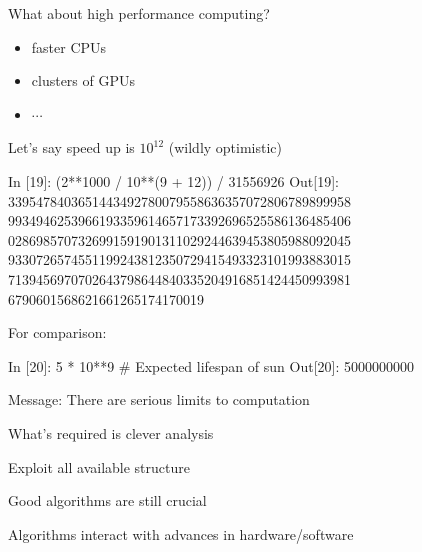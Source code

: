 \documentclass[
    xcolor={svgnames,dvipsnames},
    hyperref={colorlinks, citecolor=DeepPink4, linkcolor=DarkRed, urlcolor=DarkBlue}
    ]{beamer}  %
\newcommand{\1}{\mathbbm 1}
\begin{document}
\begin{frame}[fragile]

    What about high performance computing?
    
    \begin{itemize}
        \item faster CPUs
        \vspace{0.5em}
        \item clusters of GPUs
        \vspace{0.5em}
        \item $\cdots$
    \end{itemize}

        \vspace{0.5em}
        \vspace{0.5em}
        \vspace{0.5em}
    Let's say speed up is $10^{12}$ (wildly optimistic)



\end{frame}

\begin{frame}[fragile]


\begin{pythoncode}
In [19]: (2**1000 / 10**(9 + 12)) / 31556926
Out[19]:
3395478403651443492780079558636357072806789899958
9934946253966193359614657173392696525586136485406
0286985707326991591901311029244639453805988092045
9330726574551199243812350729415493323101993883015
7139456970702643798644840335204916851424450993981
6790601568621661265174170019
\end{pythoncode}

    For comparison:

\begin{pythoncode}
In [20]: 5 * 10**9 # Expected lifespan of sun
Out[20]: 5000000000
\end{pythoncode}


\end{frame}



\begin{frame}

    Message: There are serious limits to computation

    \vspace{1em}
    What's required is clever analysis

    \vspace{1em}
    Exploit all available structure

    \vspace{1em}
    Good algorithms are still crucial

    \vspace{1em}
    Algorithms interact with advances in hardware/software

\end{frame}
\end{document}
